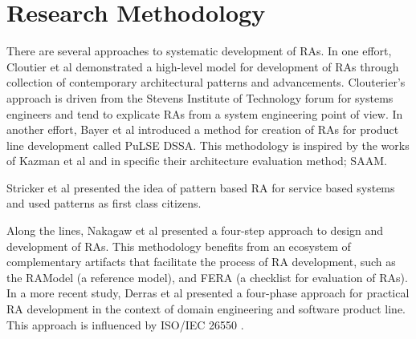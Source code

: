\documentclass[runningheads]{llncs}
\begin{document}

\section{Research Methodology}
There are several approaches to systematic development of RAs. In one effort, Cloutier et al \cite{Cloutier} demonstrated a high-level model for development of RAs through collection of contemporary architectural patterns and advancements. Clouterier's approach is driven from the Stevens Institute of Technology forum for systems engineers and tend to explicate RAs from a system engineering point of view. In another effort, Bayer et al \cite{bayer1999pulse} introduced a method for creation of RAs for product line development called PuLSE DSSA. This methodology is inspired by the works of Kazman et al \cite{kazman1994saam} and in specific their architecture evaluation method; SAAM. 


Stricker et al \cite{stricker2010creating} presented the idea of pattern based RA for service based systems and used patterns as first class citizens. 


Along the lines, Nakagaw et al \cite{nakagawa2014consolidating} presented a four-step approach to design and development of RAs. This methodology benefits from an ecosystem of complementary artifacts that facilitate the process of RA development, such as the RAModel \cite{nakagawa2012ramodel} (a reference model), and FERA \cite{santos2013checklist} (a checklist for evaluation of RAs). In a more recent study, Derras et al \cite{Derras} presented a four-phase approach for practical RA development in the context of domain engineering and software product line. This approach is influenced by ISO/IEC 26550 \cite{wg2015iso}.
\end{document}
